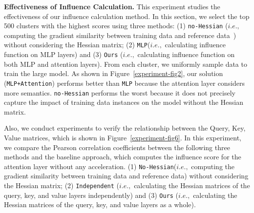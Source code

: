 \documentclass{article} %
\begin{document}

\textbf{Effectiveness of Influence Calculation.}
This experiment studies the effectiveness of our influence calculation method. In this section, we select the top 500 clusters with the highest scores using three methods: (1) \texttt{no-Hessian} ($i.e.,$ computing the gradient similarity between  training data and reference data~\citep{pruthi2020estimating}) without considering the Hessian matrix; (2)  \texttt{MLP}($i.e.,$ calculating influence function on MLP layers) and (3) \texttt{Ours} ($i.e.,$ calculating influence function on both MLP and attention layers).
%
From each cluster, we uniformly sample data to train the large model. As shown in Figure~\ref{experiment-fig2}, our solution (\texttt{MLP+Attention}) performs better than \texttt{MLP} because the attention layer considers more semantics. \texttt{no-Hessian} performs the worst because it does not precisely capture the impact of training data instances on the model without the Hessian matrix. 

Also, we conduct experiments to verify the relationship between the Query, Key, Value matrices, which is shown in Figure~\ref{experiment-fig6}.
%
In this experiment, we compare the Pearson correlation coefficients between the following three methods and the baseline approach, which computes the influence score for the attention layer without any acceleration. (1) \texttt{No-Hessian}($i.e.,$ computing the gradient similarity between  training data and reference data) without considering the Hessian matrix; (2) \texttt{Independent} ($i.e.,$ calculating the Hessian matrices of the query, key, and value layers independently) and (3) \texttt{Ours} ($i.e.,$ calculating the Hessian matrices of the query, key, and value layers as a whole).


\end{document}
